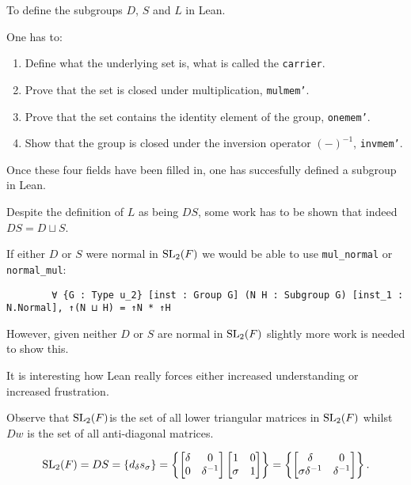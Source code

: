 \begin{remark}
    To define the subgroups $D$, $S$ and $L$ in Lean. 
    
    One has to:
    
    \begin{enumerate}
        \item Define what the underlying set is, what is called the \texttt{carrier}.
        \item Prove that the set is closed under multiplication, \texttt{mul\textunderscore mem'}.
        \item Prove that the set contains the identity element of the group, \texttt{one\textunderscore mem'}.
        \item Show that the group is closed under the inversion operator $(-)^{-1}$, \texttt{inv\textunderscore mem'}.
    \end{enumerate}

    Once these four fields have been filled in, one has succesfully defined a subgroup in Lean.
\end{remark}


\begin{remark}
    Despite the definition of $L$ as being $D S$, some work has to be shown that indeed $DS = D \sqcup S$.
    
    If either $D$ or $S$ were normal in $\operatorname{SL}_2(F)$ we would be able to use \texttt{mul\_normal} or \texttt{normal\_mul}:
    
    \begin{verbatim}
        ∀ {G : Type u_2} [inst : Group G] (N H : Subgroup G) [inst_1 : N.Normal], ↑(N ⊔ H) = ↑N * ↑H
    \end{verbatim}

    However, given neither $D$ or $S$ are normal in $\operatorname{SL}_2(F)$ slightly more work is needed to show this.
    
    It is interesting how Lean really forces either increased understanding or increased frustration.
\end{remark}

Observe that $\operatorname{SL}_2(F)$is the set of all lower triangular matrices in $\operatorname{SL}_2(F)$ whilst $Dw$ is the set of all anti-diagonal matrices.

\begin{equation} \label{Hlowertri} \operatorname{SL}_2(F)= DS =  \{d_\delta s_\sigma\} = \left\{ \begin{bmatrix} \delta & 0 \\ 0 & \delta^{-1} \end{bmatrix} \begin{bmatrix} 1 & 0 \\ \sigma & 1 \end{bmatrix} \right\} = \left\{ \begin{bmatrix} \delta & 0 \\ \sigma \delta^{-1} & \delta^{-1} \end{bmatrix}  \right\}. \end{equation}

